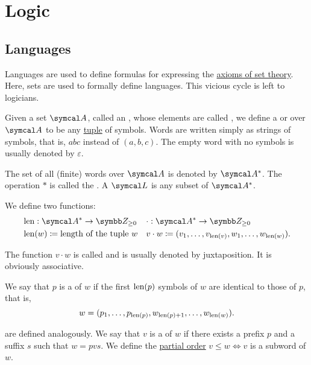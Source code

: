 \section{Logic}\label{sec:logic}
\subsection{Languages}\label{subsec:languages}

\begin{remark}\label{remark:language_definitions_using_sets}
  Languages are used to define formulas for expressing the \hyperref[def:set_zfc]{axioms of set theory}. Here, sets are used to formally define languages. This vicious cycle is left to logicians.
\end{remark}

\begin{definition}\label{def:language}
  Given a set \( \Cal{A} \), called an , whose elements are called , we define a  or  over \( \Cal{A} \) to be any \hyperref[def:cartesian_product]{tuple} of symbols. Words are written simply as strings of symbols, that is, \( abc \) instead of \( (a, b, c) \). The empty word with no symbols is usually denoted by \( \varepsilon \).

  The set of all (finite) words over \( \Cal{A} \) is denoted by \( \Cal{A}^{*} \). The operation \( * \) is called the . A  \( \Cal{L} \) is any subset of \( \Cal{A}^{*} \).

  We define two functions:
  \begin{align*}
    &\Len: \Cal{A}^{*} \to \BZ_{\geq 0}
    &&\cdot: \Cal{A}^{*} \to \BZ_{\geq 0}
    \\
    &\Len(w) \coloneqq \text{length of the tuple } w
    &&v \cdot w \coloneqq (v_1, \ldots, v_{\Len(v)}, w_1, \ldots, w_{\Len(w)}).
  \end{align*}

  The function \( v \cdot w \) is called  and is usually denoted by juxtaposition. It is obviously associative.

  We say that \( p \) is a  of \( w \) if the first \( \operatorname{len}(p) \) symbols of \( w \) are identical to those of \( p \), that is,
  \begin{equation*}
    w = (p_1, \ldots, p_{\operatorname{len}(p)}, w_{\operatorname{len}(p) + 1}, \ldots, w_{\operatorname{len}(w)}).
  \end{equation*}

   are defined analogously. We say that \( v \) is a  of \( w \) if there exists a prefix \( p \) and a suffix \( s \) such that \( w = pvs \). We define the \hyperref[def:poset]{partial order} \( v \leq w \iff v \) is a subword of \( w \).


\end{definition}
